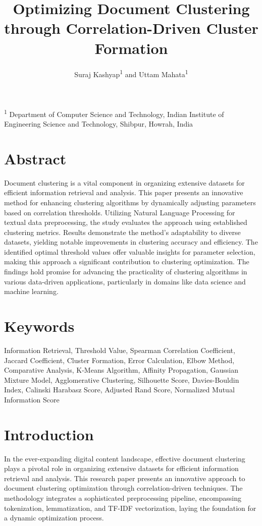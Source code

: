 \documentclass{article}
\title{Optimizing Document Clustering through Correlation-Driven Cluster Formation}
\author{Suraj Kashyap\textsuperscript{1} and Uttam Mahata\textsuperscript{1}}
\date{}
\begin{document}
\maketitle

\textsuperscript{1} Department of Computer Science and Technology, Indian Institute of Engineering Science and Technology, Shibpur, Howrah, India

\section*{Abstract}
Document clustering is a vital component in organizing extensive datasets for efficient information retrieval and analysis. This paper presents an innovative method for enhancing clustering algorithms by dynamically adjusting parameters based on correlation thresholds. Utilizing Natural Language Processing for textual data preprocessing, the study evaluates the approach using established clustering metrics. Results demonstrate the method's adaptability to diverse datasets, yielding notable improvements in clustering accuracy and efficiency. The identified optimal threshold values offer valuable insights for parameter selection, making this approach a significant contribution to clustering optimization. The findings hold promise for advancing the practicality of clustering algorithms in various data-driven applications, particularly in domains like data science and machine learning.

\section*{Keywords}
Information Retrieval, Threshold Value, Spearman Correlation Coefficient, Jaccard Coefficient, Cluster Formation, Error Calculation, Elbow Method, Comparative Analysis, K-Means Algorithm, Affinity Propagation, Gaussian Mixture Model, Agglomerative Clustering, Silhouette Score, Davies-Bouldin Index, Calinski Harabasz Score, Adjusted Rand Score, Normalized Mutual Information Score

\section{Introduction}
In the ever-expanding digital content landscape, effective document clustering plays a pivotal role in organizing extensive datasets for efficient information retrieval and analysis. This research paper presents an innovative approach to document clustering optimization through correlation-driven techniques. The methodology integrates a sophisticated preprocessing pipeline, encompassing tokenization, lemmatization, and TF-IDF vectorization, laying the foundation for a dynamic optimization process.
\end{document}

